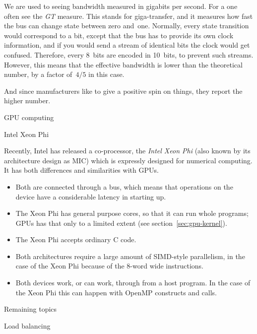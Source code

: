  We are used to seeing bandwidth
measured in gigabits per second. For a  one often
see the \emph{GT} measure. This stands
for giga-transfer, and it measures how fast the bus can change state
between zero and~one.
Normally, every state transition would correspond to a bit, except that
the bus has to provide its own clock information, and if you would send a stream
of identical bits the clock would get confused. Therefore, every 8~bits
are encoded in 10~bits, to prevent such streams. However, this means
that the effective bandwidth is lower than the theoretical number,
by a factor of~$4/5$ in this case.

And since manufacturers like to give a positive spin on things,
they report the higher number.

 {GPU computing}
\label{sec:gpu}


 {Intel Xeon Phi}

Recently, Intel has released a co-processor, the \emph{Intel Xeon Phi}
(also known by its architecture design as \ac{MIC})
which is expressly designed for numerical computing.
It has both differences and similarities with \acp{GPU}.
\begin{itemize}
\item Both are connected through a  bus, which means
  that operations on the device have a considerable latency in
  starting up.
\item The Xeon Phi has general purpose cores, so that it can run whole
  programs; \acp{GPU} has that only to a limited extent (see
  section~\ref{sec:gpu-kernel}).
\item The Xeon Phi accepts ordinary C code.
\item Both architectures require a large amount of SIMD-style
  parallelism, in the case of the Xeon Phi because of the 8-word wide
   instructions.
\item Both devices work, or can work, through 
  from a host program. In the case of the Xeon Phi this can happen
  with OpenMP constructs and  calls.
\end{itemize}


 {Remaining topics}

 {Load balancing}
\label{sec:load}

 
